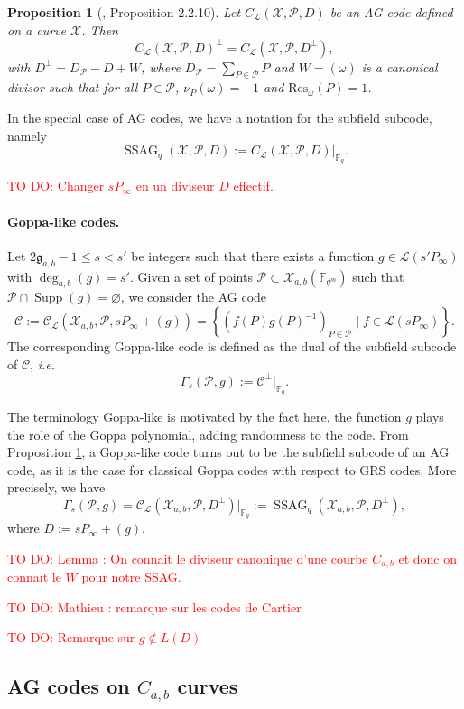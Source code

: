 \documentclass[a4paper]{article}
\newtheorem{proposition}[thm]{Proposition}
\theoremstyle{definition}
\theoremstyle{remark}
\newcommand{\calP}{\mathcal{P}}
\newcommand{\calL}{\mathcal{L}}
\newcommand{\calC}{\mathcal{C}}
\newcommand{\calX}{\mathcal{X}}
\newcommand{\fq}{\mathbb{F}_{q}}
\newcommand{\F}{\mathbb{F}}
\newcommand{\set}[1]{\left\{#1\right\}}
\newcommand{\Supp}{\operatorname{Supp}}
\newcommand{\ssag}[1]{\operatorname{SSAG}_{q}\left(#1\right)}
\newcommand{\degab}[1]{\deg_{a,b}\left(#1\right)}
\newcommand\TODO[1]{\textcolor{red}{TO DO: #1}}
\begin{document}
\begin{proposition} [\cite{Sti09}, Proposition 2.2.10] \label{prop:dual_AG_codes}
Let $C_{\calL}(\calX,\calP,D)$ be an AG-code defined on a curve $\calX$. Then 
\[C_{\calL}(\calX,\calP,D)^{\perp} = C_{\calL}(\calX,\calP,D^{\perp}),\]
with $D^{\perp} = D_{\calP}-D+W$, where $D_{\calP} = \sum\limits_{P \in \calP} P$ and $W=(\omega)$ is a canonical divisor such that for all $P \in \calP$, $\nu_P(\omega)=-1$ and $\mathrm{Res}_{\omega}(P)=1$. 
\end{proposition}

\noindent In the special case of AG codes, we have a notation for the subfield subcode, namely
$$\ssag{\calX,\calP,D} := C_{\calL}(\calX,\calP,D)|_{\fq}.$$

\TODO{Changer $sP_\infty$ en un diviseur $D$ effectif.}

\paragraph{Goppa-like codes.} Let $2\mathfrak{g}_{a,b}-1 \leq s<s'$ be integers such that there exists a function $g \in \calL(s'P_\infty)$ with $\degab{g}=s'$. Given a set of points  $\calP \subset \calX_{a,b}(\F_{q^m})$ such that $\calP \cap \Supp(g) = \varnothing$, we consider the AG code 
\[\calC := \calC_{\calL}(\calX_{a,b},\calP,sP_\infty+(g))=\set{\left(f(P)g(P)^{-1}\right)_{P \in \calP} \mid f \in \calL(sP_\infty)}.\]
The corresponding Goppa-like code is defined as the dual of the subfield subcode of $\calC$, \emph{i.e.}
$$ \Gamma_s(\calP,g) := \calC^{\perp}|_{\fq}.$$

\noindent The terminology Goppa-like is motivated by the fact here, the function $g$ plays the role of the Goppa polynomial, adding randomness to the code. From Proposition \ref{prop:dual_AG_codes}, a Goppa-like code turns out to be the subfield subcode of an AG code, as it is the case for classical Goppa codes with respect to GRS codes. More precisely, we have 
$$ \Gamma_s(\calP,g) = \calC_{\calL}(\calX_{a,b},\calP,D^{\perp})|_{\fq} := \ssag{\calX_{a,b},\calP,D^{\perp}},$$
where $D := sP_{\infty}+(g)$. 


\TODO{Lemma : On connait le diviseur canonique d'une courbe $C_{a,b}$ et donc on connait le $W$ pour notre SSAG.}

\TODO{Mathieu : remarque sur les codes de Cartier}

\TODO{Remarque sur $g \notin L(D)$}



\subsection{AG codes on $C_{a,b}$ curves} \label{section:AG_codes}
\end{document}
